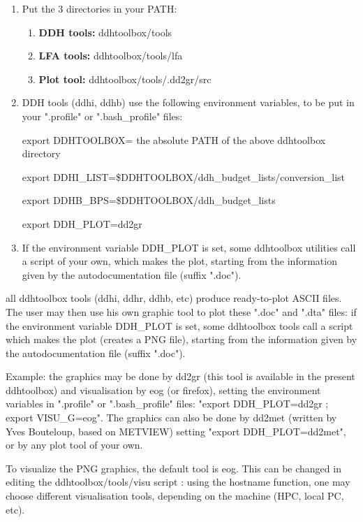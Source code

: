 \begin{enumerate}
  \item Put the 3 directories in your PATH:
    \begin{enumerate}
      \item {\bf DDH tools:} ddhtoolbox/tools
      \item {\bf LFA tools:} ddhtoolbox/tools/lfa
      \item {\bf Plot tool:} ddhtoolbox/tools/.dd2gr/src
    \end{enumerate}
  \item DDH tools (ddhi, ddhb) use the following environment variables, to be put in your ".profile" or ".bash\_profile" files:

    export DDHTOOLBOX= the absolute PATH of the above ddhtoolbox directory

    export DDHI\_LIST=\$DDHTOOLBOX/ddh\_budget\_lists/conversion\_list

    export DDHB\_BPS=\$DDHTOOLBOX/ddh\_budget\_lists

    export DDH\_PLOT=dd2gr


    \item \label{ddhplot} If the environment variable DDH\_PLOT is set, some ddhtoolbox utilities call a script of your own, which makes the plot, starting from the information given by the autodocumentation file (suffix ".doc").
\end{enumerate}

 all ddhtoolbox tools (ddhi, ddhr, ddhb, etc) produce ready-to-plot ASCII files. The user may then use his own graphic tool to plot these ".doc" and ".dta" files: if the environment variable DDH\_PLOT is set, some ddhtoolbox tools call a script which makes the plot (creates a PNG file), starting from the information given by the autodocumentation file (suffix ".doc").

\p Example: the graphics may be done by dd2gr (this tool is available in the present ddhtoolbox) and visualisation by eog (or firefox), setting the environment variables in ".profile" or ".bash\_profile" files: "export DDH\_PLOT=dd2gr ; export VISU\_G=eog". The graphics can also be done by dd2met (written by Yves Bouteloup, based on METVIEW) setting "export DDH\_PLOT=dd2met", or by any plot tool of your own.

\p To visualize the PNG graphics, the default tool is eog. This can be changed in editing the ddhtoolbox/tools/visu script : using the hostname function, one may choose different visualisation tools, depending on the machine (HPC, local PC, etc).

